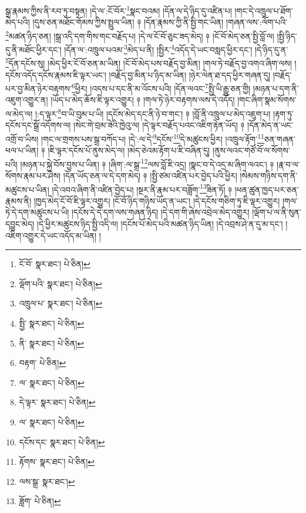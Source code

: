 སྒྲ་རྣམས་ཀྱིས་ནི་རབ་ཏུ་བསྟན། །དེ་ལ་:ངོ་བོར་\footnote{ངོ་བོ་  སྣར་ཐང་།  པེ་ཅིན། }སྣང་བའམ། །དོན་ལ་དེ་ཉིད་དུ་འཛིན་པ། །གང་དེ་འཁྲུལ་པ་ཐོག་མེད་པའི། །དུས་ཅན་མཐོང་གོམས་ཀྱིས་སྤྲུལ་ཡིན། ༈ །དོན་རྣམས་ཀྱི་ནི་སྤྱི་གང་ཡིན། །གཞན་ལས་:ལོག་པའི་\footnote{ལྡོག་པའི་  སྣར་ཐང་།  པེ་ཅིན། }མཚན་ཉིད་ཅན། །སྒྲ་འདི་དག་གིས་གང་བརྗོད་པ། །དེ་ལ་ངོ་བོ་ཅུང་ཟད་མེད། ༈ །ངོ་བོ་མེད་ཅན་སྤྱི་བློ་ལ། །སྤྱི་ཉིད་དུ་ནི་མཐོང་ཕྱིར་དང་། །དོན་ལ་:འཁྲུལ་པའམ་\footnote{འཁྲུལ་པ་  སྣར་ཐང་།  པེ་ཅིན། }མེད་པ་ནི། །སྤྱིར་\footnote{སྤྱི་  སྣར་ཐང་།  པེ་ཅིན། }འདོད་དེ་ཡང་བསླད་ཕྱིར་དང་། །དེ་ཉིད་དུ་ན་\footnote{ནི་  སྣར་ཐང་།  པེ་ཅིན། }དོན་དངོས་སུ། །མེད་ཕྱིར་ངོ་བོ་ཅན་མ་ཡིན། །ངོ་བོ་མེད་པས་བརྗོད་བྱ་མིན། །གལ་ཏེ་བརྗོད་བྱ་འགའ་ཞིག་ལས། །དངོས་འདོད་དངོས་རྣམས་ཇི་ལྟར་ཡང་། །བརྗོད་བྱ་མིན་པ་ཉིད་མ་ཡིན། །ཉེར་ལེན་ཐ་དད་ཕྱིར་གཞན་དུ། །བརྗོད་པར་བྱ་མིན་ཉེར་བརྟགས་\footnote{བརྟག་  པེ་ཅིན། }ཕྱིར། །འདས་པ་དང་ནི་མ་འོངས་པའི། །དོན་ལའང་\footnote{ལ་  སྣར་ཐང་།  པེ་ཅིན། }སྤྱི་ཡི་རྒྱུ་ཅན་གྱི། །མཉན་པ་དག་ནི་འཇུག་འགྱུར་ན། །ཡོད་པ་མེད་ཆོས་ཇི་ལྟར་འགྱུར། ༈ །གལ་ཏེ་ཉེར་བརྟགས་ལས་དེ་འདོད། །གང་ཞིག་སྣམ་སོགས་ལ་མེད་ལ། །:ད་ལྟར་\footnote{དེ་ལྟར་  སྣར་ཐང་།  པེ་ཅིན། }བ་ཡི་བུམ་པ་ཡི། །དངོས་མེད་དང་ནི་ཉེ་བ་གང་། ༈ །བློ་ནི་འཁྲུལ་པ་མེད་འཇུག་པ། །རྟག་ཏུ་དངོས་དང་སྒྲོ་འདོགས་ལ། །སེང་གེ་བྲམ་ཟེའི་ཁྱེའུ་ལ། །དེ་ལྟར་བརྗོད་པའང་འཇིག་རྟེན་ཡོད། ༈ །དོན་མེད་ན་ཡང་འགྲོ་བ་ཡིས། །གང་ལ་གྲགས་པས་སྒྲ་བཀོད་པ། །དེ་:ལ་དེ་\footnote{ལ་  སྣར་ཐང་།  པེ་ཅིན། }དངོས་\footnote{དངོས་དང་  སྣར་ཐང་།  པེ་ཅིན། }དེ་མཚུངས་ཕྱིར། །འཁྲུལ་རྟོག་\footnote{རྟོགས་  སྣར་ཐང་།  པེ་ཅིན། }ཅན་གཞན་ཕལ་པ་ཡིན། ༈ །ཇི་ལྟར་དངོས་པོ་ནུས་མེད་ལ། །མེད་ཅེའམ་རྟོག་པ་ཇི་བཞིན་དུ། །ནུས་ལའང་གཙོ་བོ་ལ་སོགས་པའི། །མཉན་པ་སྐྱེ་བོས་བྱས་པ་ཡིན། ༈ །ཞིག་:ལ་སྒྲ་\footnote{ལས་སྒྲ་  སྣར་ཐང་། }ལས་བློ་ཇི་འདྲ། །སྣང་བ་དེ་འདྲ་མ་ཞིག་ལའང་། ༈ །རྣ་བ་ལ་སོགས་རྣམ་པར་ཤེས། །དོན་ཡོད་ཅན་ལ་དེ་དག་མེད། ༈ །སྤྱི་ཙམ་འཛིན་པར་བྱེད་པའི་ཕྱིར། །སེམས་གཉིས་དག་ནི་མཚུངས་པ་ཡིན། །དེ་འབའ་ཞིག་ནི་འཛིན་བྱེད་པ། །སྔར་ནི་རྣམ་པར་བཟློག་\footnote{ཟློག་  པེ་ཅིན། }ཟིན་ཏོ། ༈ །ཕན་ཚུན་ཁྱད་པར་ཅན་རྣམས་ནི། །ཁྱད་མེད་ངོ་བོ་ཇི་ལྟར་འགྱུར། །ངོ་བོ་ཉིད་གཉིས་ཡོད་ན་ཡང་། །དེ་དངོས་གཅིག་ཏུ་ཇི་ལྟར་འགྱུར། །གལ་ཏེ་དེ་དག་མཚུངས་པ་ཡི། །དངོས་དེ་དེ་དག་ལས་གཞན་ཉིད། །དེ་དག་གི་ཞེས་འབྲེལ་མེད་འགྱུར། །ལྡོག་པ་ལ་ནི་སུན་དབྱུང་མེད། །དེ་ཕྱིར་མཚུངས་ཉིད་སྤྱི་འདི་ལ། །དངོས་པོ་མེད་པའི་མཚན་ཉིད་ཡིན། །དེ་འབྲས་ཤེ་ན་དུ་མ་དང་། །འཇིག་འགྱུར་དེ་ཡང་འདོད་མ་ཡིན། །
